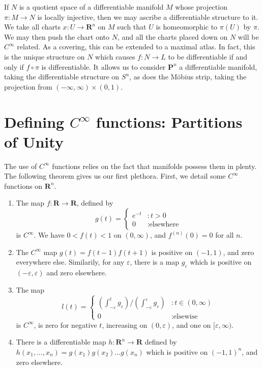 \begin{example}
    If $N$ is a quotient space of a differentiable manifold $M$ whose projection $\pi:M \to N$ is locally injective, then we may ascribe a differentiable structure to it. We take all charts $x:U \to \mathbf{R}^n$ on $M$ such that $U$ is homeomorphic to $\pi(U)$ by $\pi$. We may then push the chart onto $N$, and all the charts placed down on $N$ will be $C^\infty$ related. As a covering, this can be extended to a maximal atlas. In fact, this is the unique structure on $N$ which causes $f: N \to L$ to be differentiable if and only if $f \circ \pi$ is differentiable. It allows us to consider $\mathbf{P}^n$ a differentiable manifold, taking the differentiable structure on $S^n$, as does the M\"{o}bius strip, taking the projection from $(-\infty, \infty) \times (0,1)$.
\end{example}




\section{Defining $C^\infty$ functions: Partitions of Unity}

The use of $C^\infty$ functions relies on the fact that manifolds possess them in plenty. The following theorem gives us our first plethora. First, we detail some $C^\infty$ functions on $\mathbf{R}^n$.

\begin{enumerate}
    \item The map $f:\mathbf{R} \to \mathbf{R}$, defined by
    \[
    g(t) =
    \begin{cases}
        e^{-t} & : t > 0\\
        0 & : \text{elsewhere}
    \end{cases}
    \]
    is $C^\infty$. We have $0 < f(t) < 1$ on $(0,\infty)$, and $f^{(n)}(0) = 0$ for all $n$.
    \item The $C^\infty$ map $g(t) = f(t-1)f(t+1)$ is positive on $(-1,1)$, and zero everywhere else. Similarily, for any $\varepsilon$, there is a map $g_\varepsilon$ which is positive on $(-\varepsilon, \varepsilon)$ and zero elsewhere.
    \item The map 
    \[ l(t) = \begin{cases}
        \left(\int_{-\varepsilon}^t g_\varepsilon \right)/\left(\int_{-\varepsilon}^\varepsilon g_\varepsilon \right) & : t \in (0, \infty) \\
        0 & : \text{elsewise}
    \end{cases} \]
    is $C^\infty$, is zero for negative $t$, increasing on $(0, \varepsilon)$, and one on $[\varepsilon, \infty)$.
    \item There is a differentiable map $h:\mathbf{R}^n \to \mathbf{R}$ defined by $h(x_1, \dots, x_n) = g(x_1) g(x_2) \dots g(x_n)$ which is positive on $(-1, 1)^n$, and zero elsewhere.
\end{enumerate}

